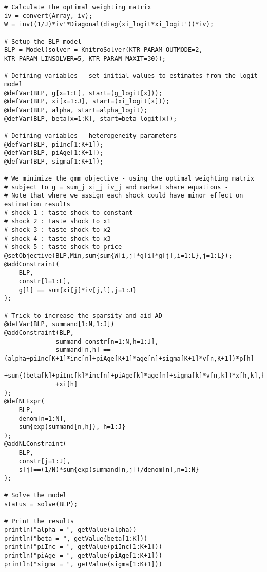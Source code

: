 \documentclass[a4paper,11pt]{article}
\begin{document}
{\begin{lstlisting}
# Calculate the optimal weighting matrix
iv = convert(Array, iv);
W = inv((1/J)*iv'*Diagonal(diag(xi_logit*xi_logit'))*iv);

# Setup the BLP model
BLP = Model(solver = KnitroSolver(KTR_PARAM_OUTMODE=2, KTR_PARAM_LINSOLVER=5, KTR_PARAM_MAXIT=30));

# Defining variables - set initial values to estimates from the logit model
@defVar(BLP, g[x=1:L], start=(g_logit[x]));
@defVar(BLP, xi[x=1:J], start=(xi_logit[x]));
@defVar(BLP, alpha, start=alpha_logit);
@defVar(BLP, beta[x=1:K], start=beta_logit[x]);

# Defining variables - heterogeneity parameters
@defVar(BLP, piInc[1:K+1]);
@defVar(BLP, piAge[1:K+1]);
@defVar(BLP, sigma[1:K+1]);

# We minimize the gmm objective - using the optimal weighting matrix
# subject to g = sum_j xi_j iv_j and market share equations - 
# Note that where we assign each shock could have minor effect on estimation results
# shock 1 : taste shock to constant
# shock 2 : taste shock to x1
# shock 3 : taste shock to x2
# shock 4 : taste shock to x3
# shock 5 : taste shock to price
@setObjective(BLP,Min,sum{sum{W[i,j]*g[i]*g[j],i=1:L},j=1:L});
@addConstraint(
    BLP, 
    constr[l=1:L], 
    g[l] == sum{xi[j]*iv[j,l],j=1:J}
);

# Trick to increase the sparsity and aid AD
@defVar(BLP, summand[1:N,1:J])
@addConstraint(BLP,
              summand_constr[n=1:N,h=1:J],
              summand[n,h] == -(alpha+piInc[K+1]*inc[n]+piAge[K+1]*age[n]+sigma[K+1]*v[n,K+1])*p[h]
              +sum{(beta[k]+piInc[k]*inc[n]+piAge[k]*age[n]+sigma[k]*v[n,k])*x[h,k],k=1:K}
              +xi[h]
);
@defNLExpr(
    BLP,
    denom[n=1:N],
    sum{exp(summand[n,h]), h=1:J}
);
@addNLConstraint(
    BLP,
    constr[j=1:J], 
    s[j]==(1/N)*sum{exp(summand[n,j])/denom[n],n=1:N}
);

# Solve the model
status = solve(BLP);

# Print the results
println("alpha = ", getValue(alpha))
println("beta = ", getValue(beta[1:K]))
println("piInc = ", getValue(piInc[1:K+1]))
println("piAge = ", getValue(piAge[1:K+1]))
println("sigma = ", getValue(sigma[1:K+1]))


\end{lstlisting}}
\end{document}
